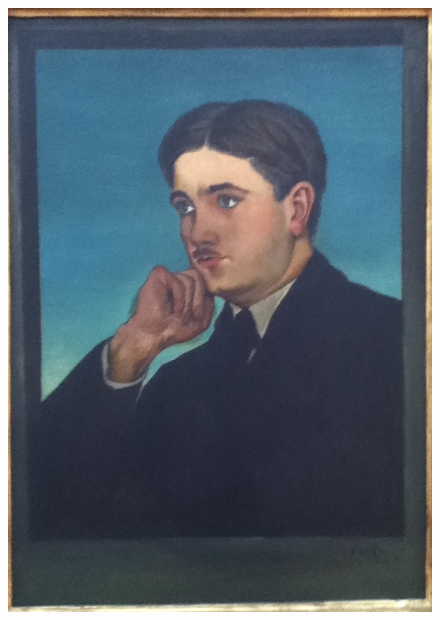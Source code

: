 \begin{figure}
\begin{minipage}[c]{.33\linewidth}
    \includegraphics[width=\textwidth]{figures/1.png}
  \end{minipage}
  \begin{minipage}[c]{.32\linewidth}
    \centering

\end{minipage}
\end{figure}
